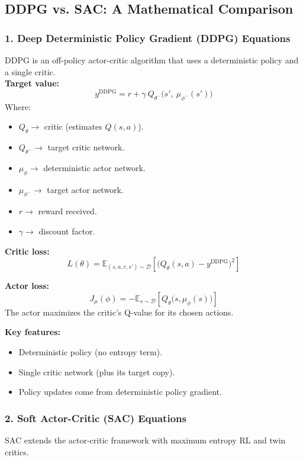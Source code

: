 \documentclass[12pt]{article}
\begin{document}
\subsection{DDPG vs. SAC: A Mathematical Comparison}

\subsubsection*{1. Deep Deterministic Policy Gradient (DDPG) Equations}
DDPG is an off-policy actor-critic algorithm that uses a deterministic policy and a single critic. \\

\textbf{Target value:}
\[
    y^{\text{DDPG}} = r + \gamma \ Q_{\theta^-} \big( s', \ \mu_{\phi^-}(s') \big)
\]
Where:
\begin{itemize}
    \item $Q_{\theta} \to$ critic (estimates $Q(s,a)$).
    \item $Q_{\theta^-} \to$ target critic network.
    \item $\mu_{\phi} \to$ deterministic actor network.
    \item $\mu_{\phi^-} \to$ target actor network.
    \item $r \to$ reward received.
    \item $\gamma \to$ discount factor.
\end{itemize}

\textbf{Critic loss:}
\[
    L(\theta) = \mathbb{E}_{(s,a,r,s') \sim \mathcal{D}} \left[ \big( Q_{\theta}(s,a) - y^{\text{DDPG}} \big)^2 \right]
\]

\textbf{Actor loss:}
\[
    J_{\mu}(\phi) = - \mathbb{E}_{s \sim \mathcal{D}} \left[ Q_{\theta}\big(s, \mu_{\phi}(s)\big) \right]
\]
The actor maximizes the critic's Q-value for its chosen actions.

\textbf{Key features:}
\begin{itemize}
    \item Deterministic policy (no entropy term).
    \item Single critic network (plus its target copy).
    \item Policy updates come from deterministic policy gradient.
\end{itemize}

\subsubsection*{2. Soft Actor-Critic (SAC) Equations}
SAC extends the actor-critic framework with maximum entropy RL and twin critics. \\
\end{document}

